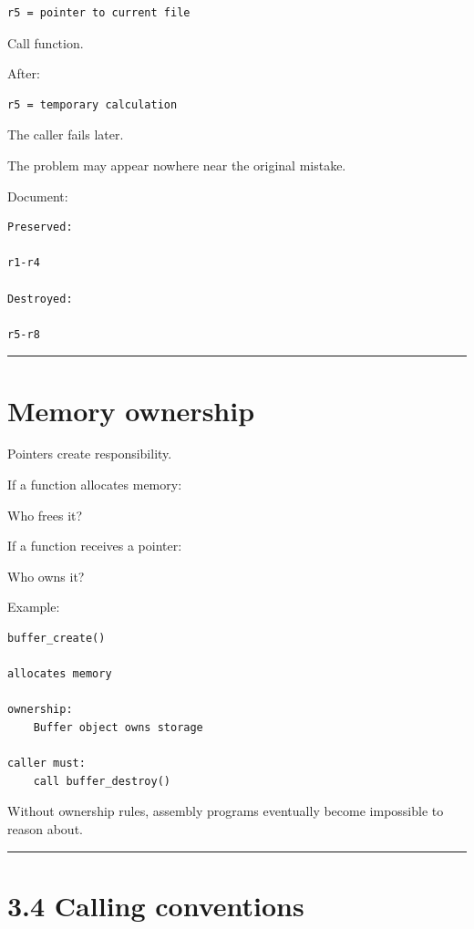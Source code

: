 \documentclass[
  oneside,
  openany]{book}
\begin{document}
\begin{verbatim}
r5 = pointer to current file
\end{verbatim}

Call function.

After:

\begin{verbatim}
r5 = temporary calculation
\end{verbatim}

The caller fails later.

The problem may appear nowhere near the original mistake.

Document:

\begin{verbatim}
Preserved:

r1-r4

Destroyed:

r5-r8
\end{verbatim}

\begin{center}\rule{0.5\linewidth}{0.5pt}\end{center}

\hypertarget{memory-ownership}{%
\section{Memory ownership}\label{memory-ownership}}

Pointers create responsibility.

If a function allocates memory:

Who frees it?

If a function receives a pointer:

Who owns it?

Example:

\begin{verbatim}
buffer_create()

allocates memory

ownership:
    Buffer object owns storage

caller must:
    call buffer_destroy()
\end{verbatim}

Without ownership rules, assembly programs eventually become impossible
to reason about.

\begin{center}\rule{0.5\linewidth}{0.5pt}\end{center}

\hypertarget{calling-conventions}{%
\section{3.4 Calling conventions}\label{calling-conventions}}
\end{document}
